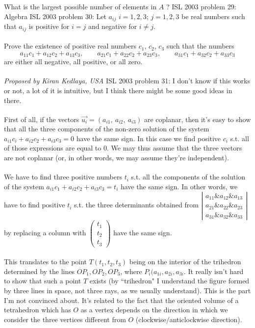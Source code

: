 What is the largest possible number of elements in $A$ ? 
ISL 2003 problem 29:  Algebra 
ISL 2003 problem 30:  Let $a_{ij}$ $i=1,2,3$; $j=1,2,3$ be real numbers such that $a_{ij}$ is positive for $i=j$ and negative for $i\neq j$. \\\\
Prove the existence of positive real numbers $c_1$, $c_2$, $c_3$ such that the numbers
\[
a_{11}c_1+a_{12}c_2+a_{13}c_3,\qquad a_{21}c_1+a_{22}c_2+a_{23}c_3,\qquad a_{31}c_1+a_{32}c_2+a_{33}c_3
\]
are either all negative, all positive, or all zero. \\\\
\textit{Proposed by Kiran Kedlaya, USA} 
ISL 2003 problem 31:  I don't know if this works or not, a lot of it is intuitive, but I think there might be some good ideas in there. \\\\
First of all, if the vectors $\vec {u_i}=(a_{i1},\ a_{i2},\ a_{i3})$ are coplanar, then it's easy to show that all the three components of the non-zero solution of the system $a_{i1}c_i+a_{i2}c_2+a_{i3}c_3=0$ have the same sign. In this case we find positive $c_i$ s.t. all of those expressions are equal to $0$. We may thus assume that the three vectors are not coplanar (or, in other words, we may assume they're independent). \\\\
We have to find three positive numbers $t_i$ s.t. all the components of the solution of the system $a_{i1}c_1+a_{i2}c_2+a_{i3}c_3=t_i$ have the same sign. In other words, we have to find positive $t_i$ s.t. the three determinants obtained from $\left |
\begin{array}{ccc}a_{11}\&a_{12}\&a_{13}\\ a_{21}\&a_{22}\&a_{23}\\ a_{31}\&a_{32}\&a_{33}\end{array}
\right |$ by replacing a column with $\left (
\begin{array}{c}t_1\\ t_2\\ t_3\end{array}
\right )$ have the same sign. \\\\
This translates to the point $T(t_1,t_2,t_3)$ being on the interior of the trihedron determined by the lines $OP_1,OP_2,OP_3$, where $P_i(a_{1i},a_{2i},a_{3i}$. It really isn't hard to show that such a point $T$ exists (by ``trihedron" I understand the figure formed by three lines in space, not three rays, as we usually understand). This is the part I'm not convinced about. It's related to the fact that the oriented volume of a tetrahedron which has $O$ as a vertex depends on the direction in which we consider the three vertices different from $O$ (clockwise/anticlockwise direction). \\\\
